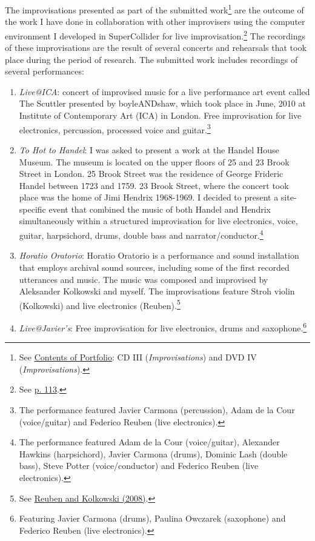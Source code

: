 The improvisations presented as part of the submitted work\footnote{See \hyperlink{portfolio}{Contents of Portfolio}: CD III (\emph{Improvisations}) and DVD IV (\emph{Improvisations}).} are the outcome of the work I have done in collaboration with other improvisers using the computer environment I developed in SuperCollider for live improvisation.\footnote{See \hyperlink{improvprog}{p. 113}.} The recordings of these improvisations are the result of several concerts and rehearsals that took place during the period of research. The submitted work includes recordings of several performances:
\begin{enumerate} 
\item \emph{Live@ICA}: concert of improvised music for a live performance art event called The Scuttler presented by boyleANDshaw, which took place in June, 2010 at Institute of Contemporary Art (ICA) in London. Free improvisation for live electronics, percussion, processed voice and guitar.\footnote{The performance featured Javier Carmona (percussion), Adam de la Cour (voice/guitar) and Federico Reuben (live electronics).}
\item \emph{To Hot to Handel}: I was asked to present a work at the Handel House Museum. The museum is located on the upper floors of 25 and 23 Brook Street in London. 25 Brook Street was the residence of George Frideric Handel between 1723 and 1759. 23 Brook Street, where the concert took place was the home of Jimi Hendrix 1968-1969. I decided to present a site-specific event that combined the music of both Handel and Hendrix simultaneously within a structured improvisation for live electronics, voice, guitar, harpsichord, drums, double bass and narrator/conductor.\footnote{The performance featured Adam de la Cour (voice/guitar), Alexander Hawkins (harpsichord), Javier Carmona (drums), Dominic Lash (double bass), Steve Potter (voice/conductor) and Federico Reuben (live electronics).}
\item \emph{Horatio Oratorio}: Horatio Oratorio is a performance and sound installation that employs archival sound sources, including some of the first recorded utterances and music. The music was composed and improvised by Aleksander Kolkowski and myself. The improvisations feature Stroh violin (Kolkowski) and live electronics (Reuben).\footnote{See \hyperlink{reuben}{Reuben and Kolkowski (2008)}.}
\item \emph{Live@Javier's}: Free improvisation for live electronics, drums and saxophone.\footnote{Featuring Javier Carmona (drums), Paulina Owczarek (saxophone) and Federico Reuben (live electronics).}

\end{enumerate}
